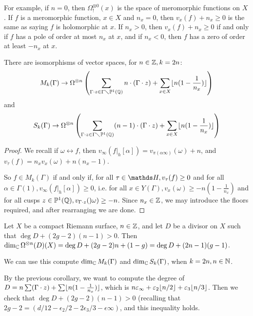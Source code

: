\documentclass[10pt,a4paper]{article}
\begin{document}
For example, if $n = 0$, then $\Omega^{\otimes 0}_! (x)$ is the space of meromorphic functions on $X$. If $f$ is a meromorphic function, $x \in X$ and $n_x =0$, then $v_x(f) + n_x \geq 0$ is the same as saying $f$ is holomorphic at $x$. If $n_x > 0$, then $v_x(f) + n_x \geq 0$ if and only if $f$ has a pole of order at most $n_x$ at $x$, and if $n_x < 0$, then $f$ has a zero of order at least $-n_x$ at $x$.

\begin{corollary}
  There are isomorphisms of vector spaces, for $n \in \mathbb{Z}, k=2n$:
  \[M_k(\Gamma) \to \Omega^{\otimes n}\left(\sum_{\Gamma \cdot z \in \Gamma \diagdown \mathbb{P}^1(\mathbb{Q})} n\cdot (\Gamma \cdot z) + \sum_{x \in X} \lfloor n(1-\frac{1}{n_x}) \rfloor\right)\]
  and
  \[S_k(\Gamma) \to \Omega^{\otimes n}\left(\sum_{\Gamma \cdot z \in \Gamma \diagdown \mathbb{P}^1(\mathbb{Q})} (n-1)\cdot (\Gamma \cdot z) + \sum_{x \in X} \lfloor n(1-\frac{1}{n_x}) \rfloor\right)\]
\end{corollary}
\begin{proof}
  We recall if $\omega \leftrightarrow f$, then $v_\infty(f|_h[\alpha]) = v_{\pi(\alpha\infty)}(\omega)+n$, and $v_\tau(f) = n_x v_x(\omega) + n(n_x-1)$.

  So $f \in M_k(\Gamma)$ if and only if, for all $\tau \in \H, v_\tau(f) \geq 0$ and for all $\alpha \in \Gamma(1), v_\infty(f|_h[\alpha]) \geq 0$, i.e. for all $x \in Y(\Gamma), v_x(\omega) \geq -n(1-\frac{1}{n_x})$ and for all cusps $z \in \mathbb{P}^1(\mathbb{Q}), v_{\Gamma\cdot z}()\omega) \geq -n$. Since $n_x \in \mathbb{Z}$, we may introduce the floors required, and after rearranging we are done.
\end{proof}
\begin{theorem}
  Let $X$ be a compact Riemann surface, $n \in \mathbb{Z}$, and let $D$ be a divisor on $X$ such that $\deg D + (2g-2)(n-1) > 0$. Then $\dim_{\mathbb{C}} \Omega^{\otimes n}(D)(X) = \deg D + (2g-2)n + (1-g) = \deg D + (2n-1)(g-1)$.
\end{theorem}
We can use this compute $\dim_{\mathbb{C}} M_k(\Gamma)$ and $\dim_{\mathbb{C}} S_k(\Gamma)$, when $k=2n, n \in \mathbb{N}$.

By the previous corollary, we want to compute the degree of $D = n\sum(\Gamma \cdot z) + \sum \lfloor n(1-\frac{1}{n_x}) \rfloor$, which is $n\varepsilon_\infty + \varepsilon_2 \lfloor n/2 \rfloor + \varepsilon_3 \lfloor n/3 \rfloor$. Then we check that $\deg D + (2g-2)(n-1) > 0$ (recalling that $2g-2 = (d/12 - \epsilon_2/2 - 2\epsilon_3/3 - \epsilon \infty)$, and this inequality holds.
\end{document}
